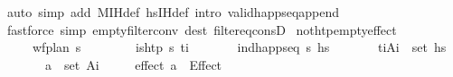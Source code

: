 \begin{isabellebody}
\ {\isacharparenleft}{\kern0pt}auto\ simp\ add{\isacharcolon}{\kern0pt}\ M{\isacharunderscore}{\kern0pt}IH{\isacharunderscore}{\kern0pt}def\ hs{\isacharprime}{\kern0pt}{\isacharunderscore}{\kern0pt}IH{\isacharunderscore}{\kern0pt}def\ intro{\isacharbang}{\kern0pt}{\isacharcolon}{\kern0pt}\ valid{\isacharunderscore}{\kern0pt}happ{\isacharunderscore}{\kern0pt}seq{\isacharunderscore}{\kern0pt}append{\isacharunderscore}{\kern0pt}{}\ \ {}{\isacharparenleft}{\kern0pt}{}{}{\isacharparenright}{\kern0pt}{\isacharparenright}{\kern0pt}\isanewline
\ \ \isamarkupfalse%
\isanewline
{}\isamarkupfalse%
\ {\isacharparenleft}{\kern0pt}fastforce\ simp{\isacharcolon}{\kern0pt}\ empty{\isacharunderscore}{\kern0pt}filter{\isacharunderscore}{\kern0pt}conv\ dest{\isacharbang}{\kern0pt}{\isacharcolon}{\kern0pt}\ filter{\isacharunderscore}{\kern0pt}eq{\isacharunderscore}{\kern0pt}consD{\isacharparenright}{\kern0pt}{\isacharplus}{\kern0pt}%
\endisatagproof
{\isafoldproof}%
%
\isadelimproof
\isanewline
%
\endisadelimproof
\isanewline
\isanewline
{}\isamarkupfalse%
\ not{\isacharunderscore}{\kern0pt}htp{\isacharunderscore}{\kern0pt}empty{\isacharunderscore}{\kern0pt}effect{\isacharcolon}{\kern0pt}\isanewline
\ \ \ \ \ {\isachardoublequoteopen}wf{\isacharunderscore}{\kern0pt}plan\ {\isasympi}s{\isachardoublequoteclose}\isanewline
\ \ \ \ \ \ \ {\isachardoublequoteopen}{\isasymnot}\ is{\isacharunderscore}{\kern0pt}htp\ {\isasympi}s\ t\isactrlsub i{\isachardoublequoteclose}\isanewline
\ \ \ \ \ \ \ {\isachardoublequoteopen}ind{\isacharunderscore}{\kern0pt}happ{\isacharunderscore}{\kern0pt}seq\ {\isasympi}s\ hs{\isachardoublequoteclose}\isanewline
\ \ \ \ \ \ \ {\isachardoublequoteopen}{\isacharparenleft}{\kern0pt}t\isactrlsub i{\isacharcomma}{\kern0pt}A\isactrlsub i{\isacharparenright}{\kern0pt}\ {\isasymin}\ set\ hs{\isachardoublequoteclose}\isanewline
\ \ \ \ \ \ \ {\isachardoublequoteopen}a\ {\isasymin}\ set\ A\isactrlsub i{\isachardoublequoteclose}\isanewline
\ \ \ \ \ {\isachardoublequoteopen}{\isacharparenleft}{\kern0pt}effect\ a{\isacharparenright}{\kern0pt}\ {\isacharequal}{\kern0pt}\ Effect\ {\isacharbrackleft}{\kern0pt}{\isacharbrackright}{\kern0pt}\ {\isacharbrackleft}{\kern0pt}{\isacharbrackright}{\kern0pt}{\isachardoublequoteclose}\isanewline
%
\isadelimproof
\ \ %
\endisadelimproof
%
\isatagproof
{}\isamarkupfalse%
\ {\isacharminus}{\kern0pt}\ \ \ \ \isanewline

\end{isabellebody}
